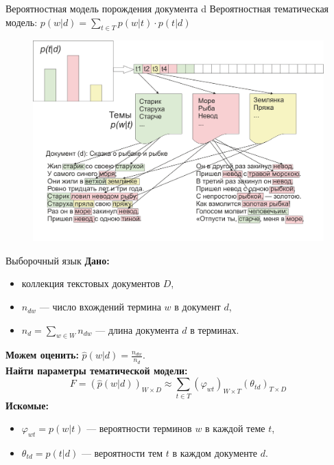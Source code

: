 \documentclass{beamer}
\begin{document}
\begin{frame}{Вероятностная модель порождения документа d}
Вероятностная тематическая модель: $p(w|d) = \sum\limits_{t\in T} p(w|t)\cdot p(t|d)$
\vspace{2\ex}
\begin{figure}
   \begin{center}
   \includegraphics[scale = 1]{Тематическая_модель.png}
   \end{center}
   \end{figure}
\end{frame}

\begin{frame}{Выборочный язык}
\textbf{Дано:} 
\begin{itemize}
    \item коллекция текстовых документов $D$,
    \item $n_{dw}$ --- число вхождений термина $w$ в документ $d$,
    \item $n_d = \sum\limits_{w \in W}n_{dw}$ --- длина документа $d$ в терминах.
\end{itemize}
\vspace{4\ex}
\textbf{Можем оценить:} $\hat{p}(w|d) = \frac{n_{dw}}{n_d}$.\\
\vspace{4\ex}
\textbf{Найти параметры тематической модели:}
\begin{equation*}
    F = \left(\hat{p}(w|d)\right)_{W \times D} \approx \sum\limits_{t \in T}(\varphi_{wt})_{W \times T}(\theta_{td})_{T \times D}
\end{equation*}
\textbf{Искомые:}
\begin{itemize}
    \item $\varphi_{wt} = p(w |t)$ --- вероятности терминов $w$ в каждой теме $t$,
    \item $\theta_{td} = p(t| d)$ --- вероятности тем $t$ в каждом документе $d$.
\end{itemize}
\end{frame}
\end{document}

